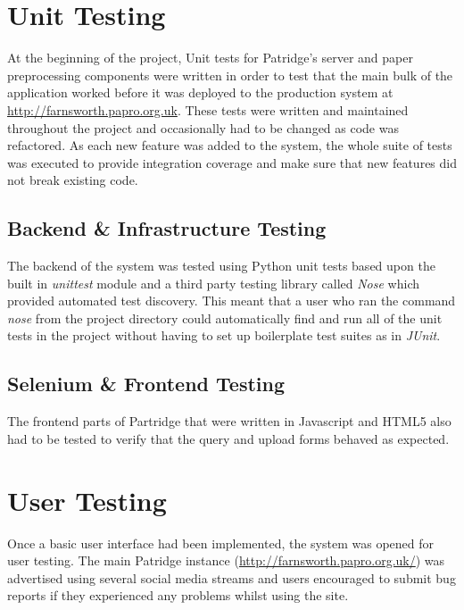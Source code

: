 %  
%

\section{ Unit Testing }

At the beginning of the project, Unit tests for Patridge's server and paper
preprocessing components were written in order to test that the main bulk of
the application worked before it was deployed to the production system at
\url{http://farnsworth.papro.org.uk}. These tests were written and maintained
throughout the project and occasionally had to be changed as code was
refactored. As each new feature was added to the system, the whole suite of
tests was executed to provide integration coverage and make sure that new
features did not break existing code. 

\subsection{ Backend \& Infrastructure Testing}

The backend of the system was tested using Python unit tests based upon the
built in \emph{unittest} module and a third party testing library called
\emph{Nose} which provided automated test discovery. This meant that a user who
ran the command \emph{nose} from the project directory could automatically find
and run all of the unit tests in the project without having to set up
boilerplate test suites as in \emph{JUnit}.



\subsection{ Selenium \& Frontend Testing }

The frontend parts of Partridge that were written in Javascript and HTML5 also
had to be tested to verify that the query and upload forms behaved as expected.


\section{ User Testing } 

Once a basic user interface had been implemented, the system was opened for
user testing. The main Patridge instance
(\url{http://farnsworth.papro.org.uk/}) was advertised using several social
media streams and users encouraged to submit bug reports if they experienced
any problems whilst using the site.


